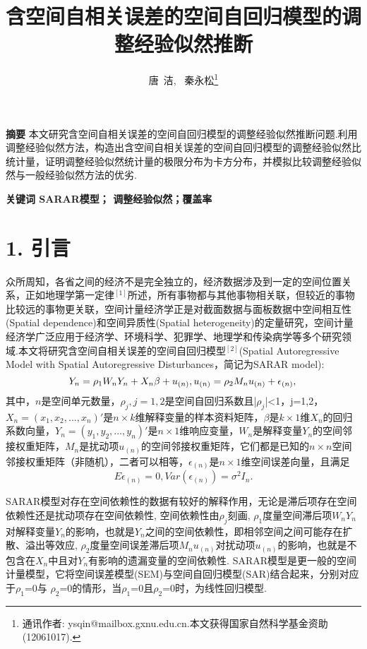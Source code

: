 \documentclass[onecolumn]{ctexart}	%
\title{含空间自相关误差的空间自回归模型的调整经验似然推断}
\author{ 唐\ 洁, \ 秦永松\thanks{通讯作者:  ysqin@mailbox.gxnu.edu.cn.本文获得国家自然科学基金资助(12061017).} }
\affil{(广西师范大学数学与统计学院 ,广西\ 桂林 \ 541004 )}
\date{\vspace{-2em}}
\begin{document}
\maketitle





\noindent  \textbf{摘要} \quad 本文研究含空间自相关误差的空间自回归模型的调整经验似然推断问题.利用调整经验似然方法，构造出含空间自相关误差的空间自回归模型的调整经验似然比统计量，证明调整经验似然统计量的极限分布为卡方分布，并模拟比较调整经验似然与一般经验似然方法的优劣.

\noindent  \textbf{关键词 \quad  SARAR模型； 调整经验似然；覆盖率}
\\

\thispagestyle{empty}%

\section*{1. 引言}

众所周知，各省之间的经济不是完全独立的，经济数据涉及到一定的空间位置关系，正如地理学第一定律$^{[1]}$所述，所有事物都与其他事物相关联，但较近的事物比较远的事物更关联，空间计量经济学正是对截面数据与面板数据中空间相互性(Spatial dependence)和空间异质性(Spatial heterogeneity)的定量研究，空间计量经济学广泛应用于经济学、环境科学、犯罪学、地理学和传染病学等多个研究领域.本文将研究含空间自相关误差的空间自回归模型$^{[2]}$(Spatial Autoregressive Model with Spatial Autoregressive Disturbances，简记为SARAR model):
\begin{equation}
    Y_{n} =\rho_1W_nY_n+X_n\beta+u_{(n)}, u_{(n)}=\rho_2M_nu_{(n)}+\epsilon_{(n)} ,\label{model}\\
\end{equation}
其中，$n$是空间单元数量，$\rho_j,j=1,2$是空间自回归系数且|$\rho_j$|<1，j=1,2，$X_n=(x_1,x_2,...,x_n )'$是$n ×k$维解释变量的样本资料矩阵，$\beta$是$k×1$维$X_n$的回归系数向量，$Y_n=(y_1,y_2,...,y_n )'$是$n ×1$维响应变量，$W_n$是解释变量$Y_n$的空间邻接权重矩阵，$M_n$是扰动项$u_{(n)}$的空间邻接权重矩阵，它们都是已知的$n ×n$空间邻接权重矩阵（非随机），二者可以相等，$\epsilon_{(n)}$是$n ×1$维空间误差向量，且满足
\[
E\epsilon_{(n)}=0,Var(\epsilon_{(n)})=\sigma^2 I_n.
\]

SARAR模型对存在空间依赖性的数据有较好的解释作用，无论是滞后项存在空间依赖性还是扰动项存在空间依赖性, 空间依赖性由$\rho_j$刻画, $\rho_1$度量空间滞后项$W_nY_n$对解释变量$Y_n$的影响，也就是$Y_n$之间的空间依赖性，即相邻空间之间可能存在扩散、溢出等效应, $\rho_2$度量空间误差滞后项$M_nu_{(n)}$对扰动项$u_{(n)}$的影响，也就是不包含在$X_n$中且对$Y_n$有影响的遗漏变量的空间依赖性. SARAR模型是更一般的空间计量模型，它将空间误差模型(SEM)与空间自回归模型(SAR)结合起来，分别对应于$\rho_1$=0与 $\rho_2$=0的情形，当$\rho_1$=0且$\rho_2$=0时，为线性回归模型.
\end{document}

